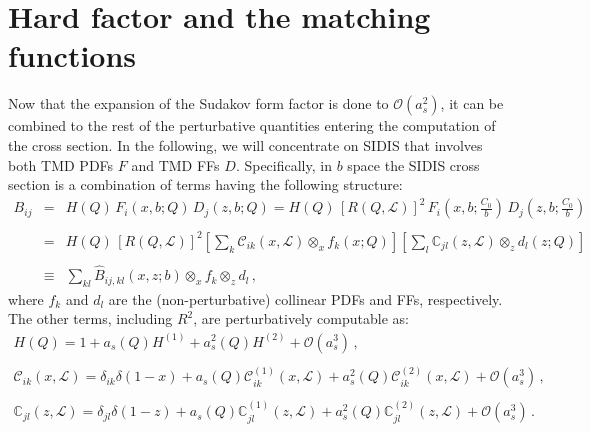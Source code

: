 \documentclass[10pt,a4paper]{article}
\begin{document}
\section{Hard factor and the matching functions}

Now that the expansion of the Sudakov form factor is done to
$\mathcal{O}(a_s^2)$, it can be combined to the rest of the
perturbative quantities entering the computation of the cross
section. In the following, we will concentrate on SIDIS that involves
both TMD PDFs $F$ and TMD FFs $D$. Specifically, in $b$ space the
SIDIS cross section is a combination of terms having the following
structure:
\begin{equation}
\begin{array}{rcl}
  \displaystyle B_{ij} &=& \displaystyle
                           H(Q)\,F_i(x,b;Q)\,D_j(z,b;Q)
                           =H(Q)\,\left[R(Q,\mathcal{L})\right]^2
                           \,F_i\left(x,b;\frac{C_0}{b}\right)\,D_j\left(z,b;\frac{C_0}{b}\right)\\
\\
&=& \displaystyle H(Q)\,\left[R(Q,\mathcal{L})\right]^2
                           \left[\sum_{k}
    \mathcal{C}_{ik}(x,\mathcal{L}) \mathop{\otimes}_x
    f_k\left(x;Q\right)\right]\left[\sum_{l}
    \mathbb{C}_{jl}(z,\mathcal{L}) \mathop{\otimes}_z
    d_l\left(z;Q\right)\right]\\
\\
&\equiv& \displaystyle \sum_{kl}\hat{B}_{ij,kl}(x,z;b)\mathop{\otimes}_{x}f_k \mathop{\otimes}_{z}d_l \,,
\end{array}
\end{equation}
where $f_k$ and $d_l$ are the (non-perturbative) collinear PDFs and FFs,
respectively. The other terms, including $R^2$, are perturbatively
computable as:
\begin{equation}
\begin{array}{l}
\displaystyle H(Q) = 1+a_s(Q)H^{(1)}+a_s^2(Q)H^{(2)}+\mathcal{O}(a_s^3)\,,\\
\\
\displaystyle \mathcal{C}_{ik}(x,\mathcal{L}) = \delta_{ik}\delta(1-x)+a_s(Q)
  \mathcal{C}_{ik}^{(1)}(x,\mathcal{L}) +a_s^2(Q) \mathcal{C}_{ik}^{(2)}(x,\mathcal{L})
  +\mathcal{O}(a_s^3) \,,\\
\\
\displaystyle \mathbb{C}_{jl}(z,\mathcal{L}) = \delta_{jl}\delta(1-z)+a_s(Q) \mathbb{C}_{jl}^{(1)}(z,\mathcal{L}) +a_s^2(Q) \mathbb{C}_{jl}^{(2)}(z,\mathcal{L}) +\mathcal{O}(a_s^3) \,.
\end{array}
\end{equation}
\end{document}
